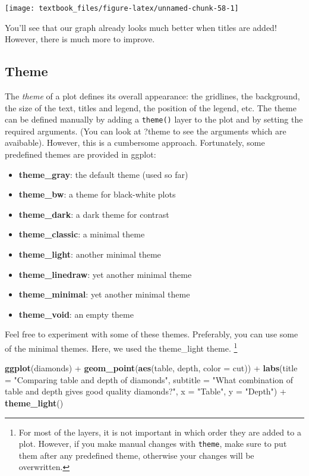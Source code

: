 \documentclass[]{tufte-book}
\newenvironment{Shaded}{}{}
\newcommand{\DataTypeTok}[1]{\textcolor[rgb]{0.56,0.13,0.00}{#1}}
\newcommand{\KeywordTok}[1]{\textcolor[rgb]{0.00,0.44,0.13}{\textbf{#1}}}
\newcommand{\NormalTok}[1]{#1}
\newcommand{\OperatorTok}[1]{\textcolor[rgb]{0.40,0.40,0.40}{#1}}
\newcommand{\StringTok}[1]{\textcolor[rgb]{0.25,0.44,0.63}{#1}}
\providecommand{\tightlist}{%
  \setlength{\itemsep}{0pt}\setlength{\parskip}{0pt}}
\begin{document}
\texttt{[image: textbook\_files/figure-latex/unnamed-chunk-58-1]}

You'll see that our graph already looks much better when titles are added! However, there is much more to improve.

\hypertarget{theme}{%
\subsection{Theme}\label{theme}}

The \emph{theme} of a plot defines its overall appearance: the gridlines, the background, the size of the text, titles and legend, the position of the legend, etc. The theme can be defined manually by adding a \texttt{theme()} layer to the plot and by setting the required arguments. (You can look at ?theme to see the arguments which are avaibable). However, this is a cumbersome approach. Fortunately, some predefined themes are provided in ggplot:

\begin{itemize}
\tightlist
\item
  \textbf{theme\_gray}: the default theme (used so far)
\item
  \textbf{theme\_bw}: a theme for black-white plots
\item
  \textbf{theme\_dark}: a dark theme for contrast
\item
  \textbf{theme\_classic}: a minimal theme
\item
  \textbf{theme\_light}: another minimal theme
\item
  \textbf{theme\_linedraw}: yet another minimal theme
\item
  \textbf{theme\_minimal}: yet another minimal theme
\item
  \textbf{theme\_void}: an empty theme
\end{itemize}

Feel free to experiment with some of these themes. Preferably, you can use some of the minimal themes. Here, we used the theme\_light theme. \footnote{For most of the layers, it is not important in which order they are added to a plot. However, if you make manual changes with \texttt{theme}, make sure to put them after any predefined theme, otherwise your changes will be overwritten.}

\begin{Shaded}
\begin{Highlighting}[]
\KeywordTok{ggplot}\NormalTok{(diamonds) }\OperatorTok{+}
\StringTok{    }\KeywordTok{geom_point}\NormalTok{(}\KeywordTok{aes}\NormalTok{(table, depth, }\DataTypeTok{color =}\NormalTok{ cut)) }\OperatorTok{+}\StringTok{ }
\StringTok{    }\KeywordTok{labs}\NormalTok{(}\DataTypeTok{title =} \StringTok{"Comparing table and depth of diamonds"}\NormalTok{,}
         \DataTypeTok{subtitle =} \StringTok{"What combination of table and depth gives good quality diamonds?"}\NormalTok{,}
         \DataTypeTok{x =} \StringTok{"Table"}\NormalTok{,}
         \DataTypeTok{y =} \StringTok{"Depth"}\NormalTok{) }\OperatorTok{+}
\StringTok{    }\KeywordTok{theme_light}\NormalTok{()}
\end{Highlighting}
\end{Shaded}
\end{document}
